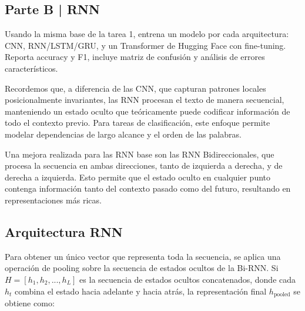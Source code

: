 \newpage

\begin{myblock}
\section*{Parte B | RNN}

    Usando la misma base de la tarea 1, entrena un modelo por cada arquitectura: 
    CNN, RNN/LSTM/GRU, y un Transformer de Hugging Face con fine-tuning. Reporta
    accuracy y F1, incluye matriz de confusión y análisis de errores característicos.  

\end{myblock}



Recordemos que, a diferencia de las CNN, que capturan patrones locales posicionalmente invariantes, las RNN
procesan el texto de manera secuencial, manteniendo un estado oculto que teóricamente puede 
codificar información de todo el contexto previo. Para tareas de clasificación, este enfoque
permite modelar dependencias de largo alcance y el orden de las palabras. 

Una mejora realizada para las RNN base son las RNN Bidireccionales, que procesa la secuencia en ambas 
direcciones, tanto de izquierda a derecha, y de derecha a izquierda. Esto permite que el 
estado oculto en cualquier punto contenga información tanto del contexto pasado como del 
futuro, resultando en representaciones más ricas. 

\subsection{Arquitectura RNN}

Para obtener un único vector que representa toda la secuencia, se aplica una operación de pooling
sobre la secuencia de estados ocultos de la Bi-RNN. Si $H = [h_1, h_2,..., h_L]$ es la
secuencia de estados ocultos concatenados, donde cada $h_t$ combina el estado hacia adelante y 
hacia atrás, la representación final $h_{\text{pooled}}$ se obtiene como:


